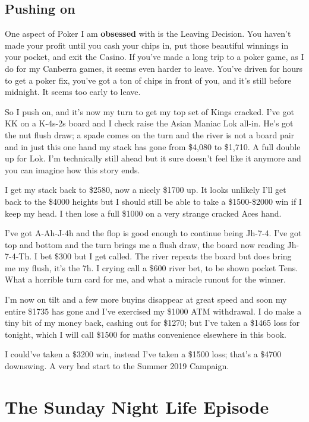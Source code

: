 \subsection*{Pushing on}

One aspect of Poker I am \textbf{obsessed} with is the Leaving
Decision. You haven't made your profit until you cash your chips in,
put those beautiful winnings in your pocket, and exit the Casino.
If you've made a long trip to a poker game, as I do for my Canberra
games, it seems even harder to leave. You've driven for hours to get a
poker fix, you've got a ton of chips in front of you, and it's still
before midnight. It seems too early to leave.

So I push on, and it's now my turn to get my top set of Kings
cracked. I've got KK on a K-4s-2s board and I check raise the Asian
Maniac Lok all-in. He's got the nut flush draw; a spade comes on the
turn and the river is not a board pair and in just this one hand my
stack has gone from \$4,080 to \$1,710. A full double up for Lok. I'm
technically still ahead but it sure doesn't feel like it anymore and
you can imagine how this story ends.

I get my stack back to \$2580, now a nicely \$1700 up. It looks
unlikely I'll get back to the \$4000 heights but I should still be
able to take a \$1500-\$2000 win if I keep my head. I then lose a full
\$1000 on a very strange cracked Aces hand.

I've got A-Ah-J-4h and the flop is good enough to continue being
Jh-7-4. I've got top and bottom and the turn brings me a flush draw,
the board now reading Jh-7-4-Th. I bet \$300 but I get called. The
river repeats the board but does bring me my flush, it's the 7h. I
crying call a \$600 river bet, to be shown pocket Tens. What a
horrible turn card for me, and what a miracle runout for the winner.

I'm now on tilt and a few more buyins disappear at great speed and
soon my entire \$1735 has gone and I've exercised my \$1000 ATM
withdrawal. I do make a tiny bit of my money back, cashing out for
\$1270; but I've taken a \$1465 loss for tonight, which I will call
\$1500 for maths convenience elsewhere in this book.

I could've taken a \$3200 win, instead I've taken a \$1500 loss;
that's a \$4700 downswing. A very bad start to the Summer 2019 Campaign.

\section*{The Sunday Night Life Episode}

